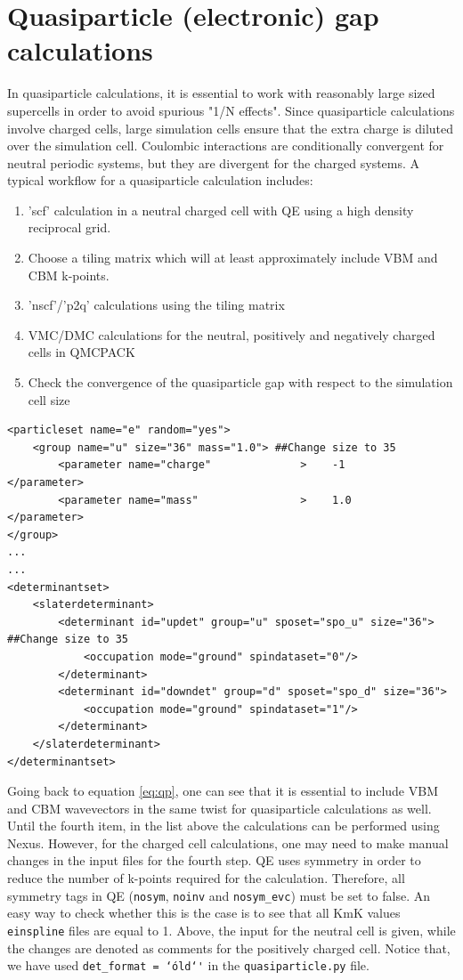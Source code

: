 \section{Quasiparticle (electronic) gap calculations}\label{sec:lab5_qp}
In quasiparticle calculations, it is essential to work with reasonably large sized supercells in order to avoid spurious "1/N effects". 
Since quasiparticle calculations involve charged cells, large simulation cells ensure that the extra charge is diluted over the simulation cell. Coulombic interactions are conditionally convergent for neutral periodic systems, but they are divergent for the charged systems. 
A typical workflow for a quasiparticle calculation includes:
\begin{enumerate}
	\item 'scf' calculation in a neutral charged cell with QE using a high density reciprocal grid.
	\item Choose a tiling matrix which will at least approximately include VBM and CBM k-points. 
	\item 'nscf'/'p2q' calculations using the tiling matrix 
	\item VMC/DMC calculations for the neutral, positively and negatively charged cells in QMCPACK
	\item Check the convergence of the quasiparticle gap with respect to the simulation cell size
\end{enumerate}
\begin{lstlisting}
<particleset name="e" random="yes">
	<group name="u" size="36" mass="1.0"> ##Change size to 35
		<parameter name="charge"              >    -1                    </parameter>
		<parameter name="mass"                >    1.0                   </parameter>
</group>
...
...
<determinantset>
	<slaterdeterminant>
		<determinant id="updet" group="u" sposet="spo_u" size="36"> ##Change size to 35
		    <occupation mode="ground" spindataset="0"/>	
		</determinant>
		<determinant id="downdet" group="d" sposet="spo_d" size="36">
		    <occupation mode="ground" spindataset="1"/>	
		</determinant>
	</slaterdeterminant>
</determinantset>
\end{lstlisting}
Going back to equation \ref{eq:qp}, one can see that it is essential to include VBM and CBM wavevectors in the same twist for quasiparticle calculations as well. 
Until the fourth item, in the list above the calculations can be performed using Nexus. 
However, for the charged cell calculations, one may need to make manual changes in the input files for the fourth step.  
QE uses symmetry in order to reduce the number of k-points required for the calculation. 
Therefore, all symmetry tags in QE (\texttt{nosym}, \texttt{noinv} and \texttt{nosym\_evc}) must be set to false. 
An easy way to check whether this is the case is to see that all KmK values \texttt{einspline} files are equal to 1. 
Above, the input for the neutral cell is given, while the changes are denoted as comments for the positively charged cell. 
Notice that, we have used \texttt{det\_format      = \char`\'old\char`\'} in the \texttt{quasiparticle.py} file.
